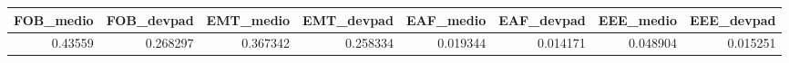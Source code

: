 \begin{tabular}{rrrrrrrr}
\toprule
 FOB\_medio &  FOB\_devpad &  EMT\_medio &  EMT\_devpad &  EAF\_medio &  EAF\_devpad &  EEE\_medio &  EEE\_devpad \\
\midrule
   0.43559 &    0.268297 &   0.367342 &    0.258334 &   0.019344 &    0.014171 &   0.048904 &    0.015251 \\
\bottomrule
\end{tabular}
